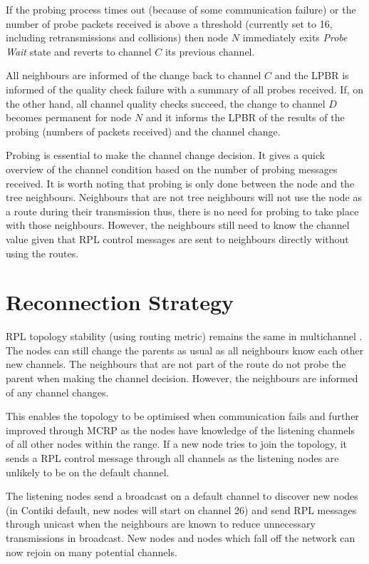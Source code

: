 If the probing process times out (because of some communication failure) or the number of probe packets received is above a threshold (currently set to 16, including retransmissions and collisions) then node $N$ immediately exits \emph{Probe Wait} state and reverts to channel $C$ its previous channel. 

All neighbours are informed of the change back to channel $C$ and the LPBR is informed of the quality check failure with a summary of all probes received.
If, on the other hand, all channel quality checks succeed, the change to channel $D$ becomes permanent for node $N$ and it informs the LPBR of the results of the probing (numbers of packets received) and the channel change.

Probing is essential to make the channel change decision. It gives a quick overview of the channel condition based on the number of probing messages received. It is worth noting that probing is only done between the node and the tree neighbours. Neighbours that are not tree neighbours will not use the node as a route during their transmission thus, there is no need for probing to take place with those neighbours. However, the neighbours still need to know the channel value given that RPL control messages are sent to neighbours directly without using the routes.

\section{Reconnection Strategy}
RPL topology stability (using routing metric) remains the same in multichannel \cite{routingmetrics, winter2012rpl}.
The nodes can still change the parents as usual as all neighbours know each other new channels. The neighbours that are not part of the route do not probe the parent when making the channel decision. However, the neighbours are informed of any channel changes.

This enables the topology to be optimised when communication fails and further improved through MCRP as the nodes have knowledge of the listening channels of all other nodes within the range. If a new node tries to join the topology, it sends a RPL control message through all channels as the listening nodes are unlikely to be on the default channel. 

The listening nodes send a broadcast on a default channel to discover new nodes (in Contiki default, new nodes will start on channel 26) and send RPL messages through unicast when the neighbours are known to reduce unnecessary transmissions in broadcast. New nodes and nodes which fall off the network can now rejoin on many potential channels.